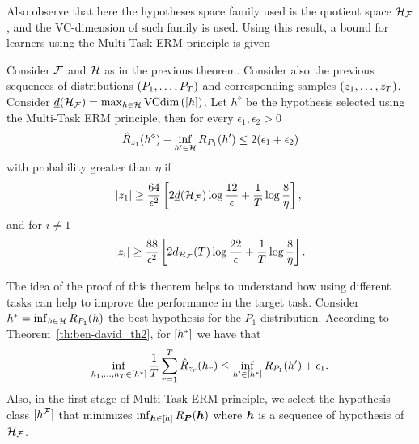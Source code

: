 Also observe that here the hypotheses space family used is the quotient space $\mathcal{H}_{\mathcal{F}}$, and the VC-dimension of such family is used.
%
Using this result, a bound for learners using the Multi-Task ERM principle is given~\cite[Theorem~3]{Ben-DavidB08}
\begin{theorem}\label{th:ben-david_th3}
    Consider $\mathcal{F}$ and $\mathcal{H}$ as in the previous theorem. Consider also the previous sequences of distributions $(P_1, \ldots, P_T)$ and corresponding samples $(z_1, \ldots, z_T)$. Consider $\underline{d}(\mathcal{H}_{\mathcal{F}}) = \max_{h \in \mathcal{H}} \text{VCdim}\left(\lbrack h\rbrack\right)$.
    Let $h^\diamond$ be the hypothesis selected using the Multi-Task ERM principle, then for every $\epsilon_1, \epsilon_2 > 0$
    \begin{equation}
        \nonumber
        {\hat{R}_{z_1}(h^\diamond) - \inf_{h' \in \mathcal{H}}R_{P_1}(h')}  \leq 2(\epsilon_1 + \epsilon_2)
    \end{equation}
    with probability greater than $\eta$ if
    \begin{equation}
        \label{eq:ben-david_th3_ineq1}
        \cardinal{\sample_1} \geq  \frac{64}{\epsilon^2} \left[2 \underline{d}(\hypspace_\frelset) \log \frac{12}{\epsilon} + \frac{1}{\ntasks}\log\frac{8}{\eta} \right], \; 
    \end{equation}
    and for $i \neq 1$
    \begin{equation}
        \label{eq:ben-david_th3_ineq2}
        \cardinal{\sample_i} \geq  \frac{88}{\epsilon^2} \left[2 d_{\hypspace_\frelset}(\ntasks) \log \frac{22}{\epsilon} + \frac{1}{\ntasks}\log\frac{8}{\eta} \right] .
    \end{equation}
\end{theorem}
The idea of the proof of this theorem helps to understand how using different tasks can help to improve the performance in the target task. 
Consider $h^* = \inf_{h \in \mathcal{H}} R_{P_1}(h)$ the best hypothesis for the $P_1$ distribution.
According to Theorem~\ref{th:ben-david_th2}, for $\lbrack h^*\rbrack$ we have that
\begin{equation}
    \nonumber
    {\inf_{h_1, \ldots, h_T\in \lbrack h^*\rbrack} \frac{1}{T} \sum_{r=1}^T\hat{R}_{z_r}(h_r) \leq \inf_{h' \in \lbrack h^*\rbrack}R_{P_1}(h')}  + \epsilon_1.
\end{equation}
%
Also, in the first stage of Multi-Task ERM principle, we select the hypothesis class $\lbrack h^{\mathcal{F}}\rbrack$ that minimizes $\inf_{\bm{h} \in \lbrack h\rbrack} R_{\bm{P}}(\bm{h})$ where $\bm{h}$ is a sequence of hypothesis of $\mathcal{H}_{\mathcal{F}}$.
